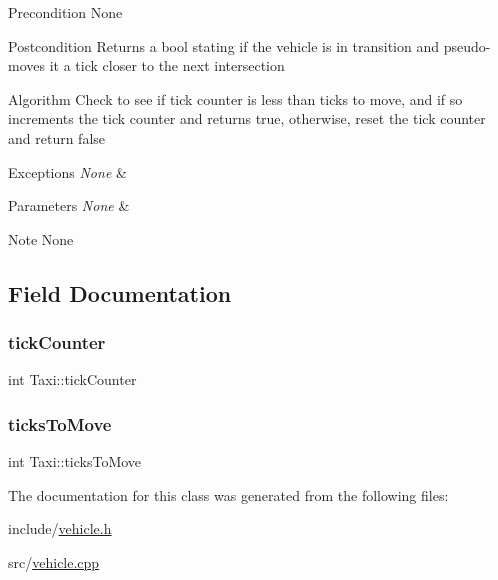 \begin{DoxyPrecond}{Precondition}
None
\end{DoxyPrecond}
\begin{DoxyPostcond}{Postcondition}
Returns a bool stating if the vehicle is in transition and pseudo-\/moves it a tick closer to the next intersection
\end{DoxyPostcond}
\begin{DoxyParagraph}{Algorithm}
Check to see if tick counter is less than ticks to move, and if so increments the tick counter and returns true, otherwise, reset the tick counter and return false
\end{DoxyParagraph}

\begin{DoxyExceptions}{Exceptions}
{\em None} & \\
\hline
\end{DoxyExceptions}

\begin{DoxyParams}{Parameters}
{\em None} & \\
\hline
\end{DoxyParams}
\begin{DoxyNote}{Note}
None 
\end{DoxyNote}


\subsection{Field Documentation}
\hypertarget{class_taxi_a0a4e5ff5819d2c7399791a1f2b51ad32}{}\label{class_taxi_a0a4e5ff5819d2c7399791a1f2b51ad32} 
\subsubsection{\texorpdfstring{tick\+Counter}{tickCounter}}
{\footnotesize\ttfamily int Taxi\+::tick\+Counter\hspace{0.3cm}{\ttfamily [private]}}

\hypertarget{class_taxi_adf5a19300ef6848794fa79adf3b7bc5a}{}\label{class_taxi_adf5a19300ef6848794fa79adf3b7bc5a} 
\subsubsection{\texorpdfstring{ticks\+To\+Move}{ticksToMove}}
{\footnotesize\ttfamily int Taxi\+::ticks\+To\+Move\hspace{0.3cm}{\ttfamily [private]}}



The documentation for this class was generated from the following files\+:\begin{DoxyCompactItemize}
\item 
include/\hyperlink{vehicle_8h}{vehicle.\+h}\item 
src/\hyperlink{vehicle_8cpp}{vehicle.\+cpp}\end{DoxyCompactItemize}
